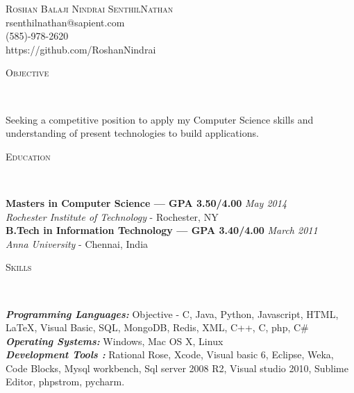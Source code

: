 \documentclass[9pt]{article}
\newenvironment{changemargin}[2]{%
  \begin{list}{}{%
    \setlength{\topsep}{0pt}%
    \setlength{\leftmargin}{#1}%
    \setlength{\rightmargin}{#2}%
    \setlength{\listparindent}{\parindent}%
    \setlength{\itemindent}{\parindent}%
    \setlength{\parsep}{\parskip}%
  }%
  \item[]}{\end{list}
}
\newcommand{\lineover}{
	\begin{changemargin}{-0.05in}{-0.05in}
		\vspace*{-8pt}
		\hrulefill \\
		\vspace*{-2pt}
	\end{changemargin}
}
\newcommand{\header}[1]{
	\begin{changemargin}{-0.5in}{-0.5in}
		\scshape{#1}\\
  	\lineover
	\end{changemargin}
}
\newcommand{\contact}[4]{
	\begin{changemargin}{-0.5in}{-0.5in}
		\begin{center}
			{\Large \scshape {#1}}\\ \smallskip
			{#2}\\ \smallskip 
			{#3}\\ \smallskip
			{#4}\smallskip
		\end{center}
	\end{changemargin}
}
\newenvironment{body} {
	\vspace*{-16pt}
	\begin{changemargin}{-0.25in}{-0.5in}
  }	
	{\end{changemargin}
}
\begin{document}
\contact{Roshan Balaji Nindrai SenthilNathan}{rsenthilnathan@sapient.com}{(585)-978-2620}{https://github.com/RoshanNindrai}


\header{Objective}

\begin{body}
	\vspace{14pt}
	Seeking a competitive position to apply my Computer Science skills and understanding of present technologies to build applications.
\end{body}

\smallskip


\header{Education}

\begin{body}
	\vspace{14pt}
	\textbf{Masters in Computer Science\hspace{23pt} --- GPA 3.50/4.00}{} \hfill \emph{May 2014}{} \\
	\emph{Rochester Institute of Technology} - Rochester, NY{} \\
  \medskip
	\textbf{B.Tech in Information Technology --- GPA 3.40/4.00} \hfill \emph{March 2011} \\
	\emph{Anna University} - Chennai, India\\
\end{body}

\smallskip

\header{Skills}

\begin{body}
	\vspace{14pt}
	\emph{\textbf{Programming Languages:}}{} Objective - C,  Java, Python,  Javascript, HTML,  \LaTeX, Visual Basic, SQL, MongoDB, Redis, XML, C++, C, php,  C\#\\
	\medskip
	\emph{\textbf{Operating Systems:}}{} Windows, Mac OS X, Linux\\
\medskip
\emph{\textbf{Development Tools :}}{} Rational Rose, Xcode, Visual basic 6, Eclipse, Weka, Code Blocks, Mysql workbench, Sql server 2008 R2, Visual studio 2010, Sublime Editor, phpstrom, pycharm.\\
\end{body}
\end{document}
